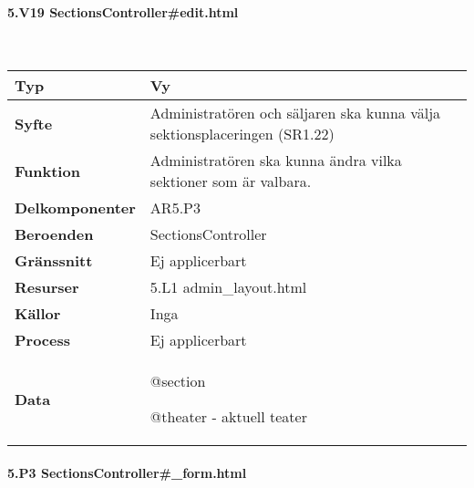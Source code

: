\documentclass[a4paper, twoside, 11pt, titlepage]{article}
\begin{document}
			\paragraph{5.V19 SectionsController\#edit.html}\

			\begin {table} [ht] \begin{tabular} {  p{3.5cm} p{11.6cm} }
				\hline
				{\sffamily\textbf{Typ}} & {Vy} \\
				\hline
				{\sffamily\textbf{Syfte}} & {Administratören och säljaren ska kunna välja sektionsplaceringen (SR1.22)} \\
				\hline
				{\sffamily\textbf{Funktion}} & {Administratören ska kunna ändra vilka sektioner som är valbara.} \\
				\hline
				{\sffamily\textbf{Delkomponenter}} & {AR5.P3} \\
				\hline
				{\sffamily\textbf{Beroenden}} & {SectionsController} \\
				\hline
				{\sffamily\textbf{Gränssnitt}} & {Ej applicerbart} \\
				\hline
				{\sffamily\textbf{Resurser}} & {5.L1 admin\_layout.html} \\
				\hline
				{\sffamily\textbf{Källor}} & {Inga} \\
				\hline
				{\sffamily\textbf{Process}} & {Ej applicerbart} \\
				\hline
				{\sffamily\textbf{Data}} & {@section

@theater - aktuell teater} \\
				\hline
			\end{tabular} \end{table} \FloatBarrier


			\clearpage %
			\paragraph{5.P3 SectionsController\#\_form.html}\
\end{document}
